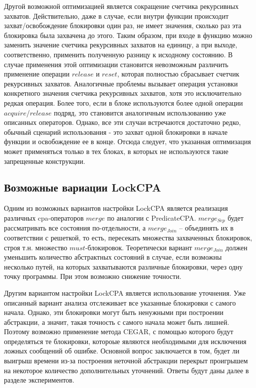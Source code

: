 Другой возможной оптимизацией является сокращение счетчика рекурсивных захватов.
Действительно, даже в случае, если внутри функции происходит захват/освобождение блокировки один раз, не имеет значения, сколько раз эта блокировка была захвачена до этого. 
Таким образом, при входе в функцию можно заменить значение счетчика рекурсивных захватов на единицу, а при выходе, соответственно, применить полученную разницу к исходному состоянию.
В случае применения этой оптимизации становится невозможным различить применение операции $release$ и $reset$, которая полностью сбрасывает счетчик рекурсивных захватов. 
Аналогичные проблемы вызывает операция установки конкретного значения счетчика рекурсивных захватов, хотя это исключительно редкая операция.
Более того, если в блоке используются более одной операции $acquire$/$release$ подряд, это становится аналогичным использованию уже описанных операторов.
Однако, все эти случаи встречаются достаточно редко, обычный сценарий использования - это захват одной блокировки в начале функции и освобождение ее в конце.
Отсюда следует, что указанная оптимизация может применяться только в тех блоках, в которых не используются такие запрещенные конструкции.

\subsection{Возможные вариации LockCPA}
\label{subsect_lock_merge}

Одним из возможных вариантов настройки LockCPA является реализация различных cpa-операторов $merge$ по аналогии с PredicateCPA.
$merge_{Sep}$ будет рассматривать все состояния по-отдельности, а $merge_{Join}$ -- объединять их в соответствии с решеткой, то есть, пересекать множества захваченных блокировок, строя т.н. множество $must$-блокировок.
Теоретически вариант $merge_{Join}$ должен уменьшить количество абстрактных состояний в случае, если возможны несколько путей, на которых захватываются различные блокировки, через одну точку программы.
При этом возможно снижение точности. 

Другим вариантом настройки LockCPA является использование уточнения.
Уже описанный вариант анализа отслеживает все указанные блокировки с самого начала. Однако, эти блокировки могут быть ненужными при построении абстракции, а значит, такая точность с самого начала может быть лишней.
Поэтому возможно применение метода CEGAR, с помощью которого будут определяться те блокировки, котороые являются необходимыми для исключения ложных сообщений об ошибке.
Основной вопрос заключается в том, будет ли выигрыш времени из-за построения неточной абстракции перекрыт проигрышем на некоторое количество дополнительных уточнений.
Ответы будут даны далее в разделе экспериментов.

